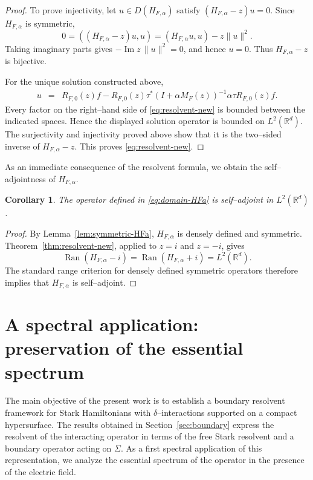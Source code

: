 \documentclass[a4paper,11pt]{article}
\numberwithin{equation}{section}
\newtheorem{cor}[lem]{Corollary}
\theoremstyle{remark}
\theoremstyle{definition}
\theoremstyle{remark}
\begin{document}
\begin{proof}
To prove injectivity, let $u\in D(H_{F,\alpha})$ satisfy $(H_{F,\alpha}-z)u=0$.
Since $H_{F,\alpha}$ is symmetric,
$$
0=((H_{F,\alpha}-z)u,u)
=(H_{F,\alpha}u,u)-z\|u\|^2.
$$
Taking imaginary parts gives $-\operatorname{Im}z\,\|u\|^2=0$, and hence $u=0$.
Thus $H_{F,\alpha}-z$ is bijective.

For the unique solution constructed above,
\begin{eqnarray*}
u
&=&R_{F,0}(z)f
-R_{F,0}(z)\tau^*(I+\alpha M_F(z))^{-1}
\alpha\tau R_{F,0}(z)f.
\end{eqnarray*}
Every factor on the right--hand side of \eqref{eq:resolvent-new} is bounded between the indicated spaces.
Hence the displayed solution operator is bounded on $L^2(\mathbb R^d)$.
The surjectivity and injectivity proved above show that it is the two--sided inverse of $H_{F,\alpha}-z$.
This proves \eqref{eq:resolvent-new}.
\end{proof}

As an immediate consequence of the resolvent formula, we obtain the self--adjointness of $H_{F,\alpha}$.

\begin{cor}\label{cor:selfadjoint-HFa}
The operator defined in \eqref{eq:domain-HFa} is self--adjoint in $L^2(\mathbb R^d)$.
\end{cor}

\begin{proof}
By Lemma~\ref{lem:symmetric-HFa}, $H_{F,\alpha}$ is densely defined and symmetric.
Theorem~\ref{thm:resolvent-new}, applied to $z=i$ and $z=-i$, gives
$$
\operatorname{Ran}(H_{F,\alpha}-i)
=
\operatorname{Ran}(H_{F,\alpha}+i)
=
L^2(\mathbb R^d).
$$
The standard range criterion for densely defined symmetric operators therefore
implies that $H_{F,\alpha}$ is self--adjoint.
\end{proof}

\section{A spectral application: preservation of the essential spectrum}

The main objective of the present work is to establish a boundary resolvent framework for Stark Hamiltonians with $\delta$--interactions supported on a compact hypersurface.
The results obtained in Section~\ref{sec:boundary} express the resolvent of the interacting operator in terms of the free Stark resolvent and a boundary operator acting on $\Sigma$.
As a first spectral application of this representation, we analyze the essential spectrum of the operator in the presence of the electric field.
\end{document}
